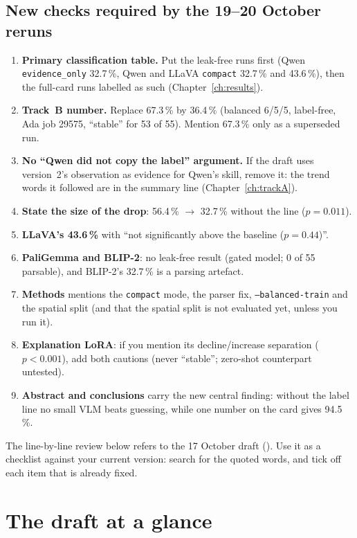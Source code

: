 \subsection*{New checks required by the 19--20 October reruns}

\begin{enumerate}
  \item \textbf{Primary classification table.} Put the leak-free runs first (Qwen \texttt{evidence\_only} 32.7\,\%, Qwen and LLaVA \texttt{compact} 32.7\,\% and 43.6\,\%), then the full-card runs labelled as such (Chapter~\ref{ch:results}).
  \item \textbf{Track~B number.} Replace 67.3\,\% by 36.4\,\% (balanced 6/5/5, label-free, Ada job 29575, ``stable'' for 53 of 55). Mention 67.3\,\% only as a superseded run.
  \item \textbf{No ``Qwen did not copy the label'' argument.} If the draft uses version~2's observation as evidence for Qwen's skill, remove it: the trend words it followed are in the summary line (Chapter~\ref{ch:trackA}).
  \item \textbf{State the size of the drop}: 56.4\,\% $\rightarrow$ 32.7\,\% without the line ($p = 0.011$).
  \item \textbf{LLaVA's 43.6\,\%} with ``not significantly above the baseline ($p = 0.44$)''.
  \item \textbf{PaliGemma and BLIP-2}: no leak-free result (gated model; 0 of 55 parsable), and BLIP-2's 32.7\,\% is a parsing artefact.
  \item \textbf{Methods} mentions the \texttt{compact} mode, the parser fix, \texttt{--balanced-train} and the spatial split (and that the spatial split is not evaluated yet, unless you run it).
  \item \textbf{Explanation LoRA}: if you mention its decline/increase separation ($p < 0.001$), add both cautions (never ``stable''; zero-shot counterpart untested).
  \item \textbf{Abstract and conclusions} carry the new central finding: without the label line no small VLM beats guessing, while one number on the card gives 94.5\,\%.
\end{enumerate}

The line-by-line review below refers to the 17 October draft (). Use it as a checklist against your current version: search for the quoted words, and tick off each item that is already fixed.

\section{The draft at a glance}

